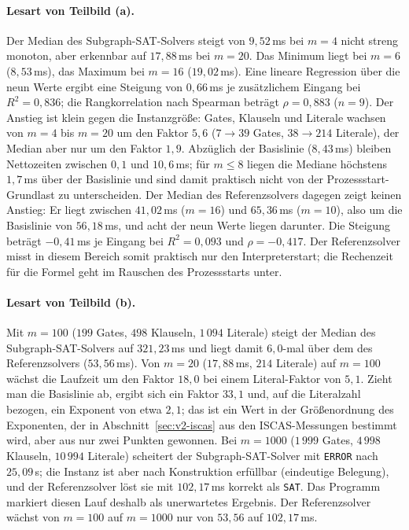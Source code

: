 \documentclass[a4paper,12pt]{article}
\theoremstyle{definition}
\begin{document}
\paragraph{Lesart von Teilbild (a).} Der Median des Subgraph-SAT-Solvers steigt von $9{,}52$\,ms bei $m=4$ nicht streng monoton, aber erkennbar auf $17{,}88$\,ms bei $m=20$. Das Minimum liegt bei $m=6$ ($8{,}53$\,ms), das Maximum bei $m=16$ ($19{,}02$\,ms). Eine lineare Regression über die neun Werte ergibt eine Steigung von $0{,}66$\,ms je zusätzlichem Eingang bei $R^2 = 0{,}836$; die Rangkorrelation nach Spearman beträgt $\rho = 0{,}883$ ($n=9$). Der Anstieg ist klein gegen die Instanzgröße: Gates, Klauseln und Literale wachsen von $m=4$ bis $m=20$ um den Faktor $5{,}6$ ($7 \to 39$ Gates, $38 \to 214$ Literale), der Median aber nur um den Faktor $1{,}9$. Abzüglich der Basislinie ($8{,}43$\,ms) bleiben Nettozeiten zwischen $0{,}1$ und $10{,}6$\,ms; für $m \le 8$ liegen die Mediane höchstens $1{,}7$\,ms über der Basislinie und sind damit praktisch nicht von der Prozessstart-Grundlast zu unterscheiden. Der Median des Referenzsolvers dagegen zeigt keinen Anstieg: Er liegt zwischen $41{,}02$\,ms ($m=16$) und $65{,}36$\,ms ($m=10$), also um die Basislinie von $56{,}18$\,ms, und acht der neun Werte liegen darunter. Die Steigung beträgt $-0{,}41$\,ms je Eingang bei $R^2 = 0{,}093$ und $\rho = -0{,}417$. Der Referenzsolver misst in diesem Bereich somit praktisch nur den Interpreterstart; die Rechenzeit für die Formel geht im Rauschen des Prozessstarts unter.

\paragraph{Lesart von Teilbild (b).} Mit $m=100$ ($199$ Gates, $498$ Klauseln, $1\,094$ Literale) steigt der Median des Subgraph-SAT-Solvers auf $321{,}23$\,ms und liegt damit $6{,}0$-mal über dem des Referenzsolvers ($53{,}56$\,ms). Von $m=20$ ($17{,}88$\,ms, $214$ Literale) auf $m=100$ wächst die Laufzeit um den Faktor $18{,}0$ bei einem Literal-Faktor von $5{,}1$. Zieht man die Basislinie ab, ergibt sich ein Faktor $33{,}1$ und, auf die Literalzahl bezogen, ein Exponent von etwa $2{,}1$; das ist ein Wert in der Größenordnung des Exponenten, der in Abschnitt~\ref{sec:v2-iscas} aus den ISCAS-Messungen bestimmt wird, aber aus nur zwei Punkten gewonnen. Bei $m=1000$ ($1\,999$ Gates, $4\,998$ Klauseln, $10\,994$ Literale) scheitert der Subgraph-SAT-Solver mit \texttt{ERROR} nach $25{,}09$\,s; die Instanz ist aber nach Konstruktion erfüllbar (eindeutige Belegung), und der Referenzsolver löst sie mit $102{,}17$\,ms korrekt als \texttt{SAT}. Das Programm markiert diesen Lauf deshalb als \glqq unerwartetes Ergebnis\grqq{}. Der Referenzsolver wächst von $m=100$ auf $m=1000$ nur von $53{,}56$ auf $102{,}17$\,ms.
\end{document}
